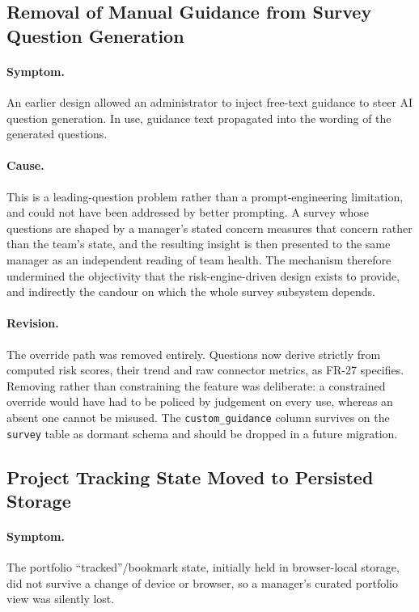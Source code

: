 \subsection{Removal of Manual Guidance from Survey Question Generation}
\label{subsec:deviation-guidance}

\paragraph{Symptom.} An earlier design allowed an administrator to inject
free-text guidance to steer AI question generation. In use, guidance text
propagated into the wording of the generated questions.

\paragraph{Cause.} This is a leading-question problem rather than a
prompt-engineering limitation, and could not have been addressed by better
prompting. A survey whose questions are shaped by a manager's stated concern
measures that concern rather than the team's state, and the resulting insight is
then presented to the same manager as an independent reading of team health. The
mechanism therefore undermined the objectivity that the risk-engine-driven
design exists to provide, and indirectly the candour on which the whole survey
subsystem depends.

\paragraph{Revision.} The override path was removed entirely. Questions now
derive strictly from computed risk scores, their trend and raw connector
metrics, as FR-27 specifies. Removing rather than constraining the feature was
deliberate: a constrained override would have had to be policed by judgement on
every use, whereas an absent one cannot be misused. The
\texttt{custom\_guidance} column survives on the \texttt{survey} table as
dormant schema and should be dropped in a future migration.

\subsection{Project Tracking State Moved to Persisted Storage}
\label{subsec:deviation-tracking}

\paragraph{Symptom.} The portfolio ``tracked''/bookmark state, initially held in
browser-local storage, did not survive a change of device or browser, so a
manager's curated portfolio view was silently lost.

